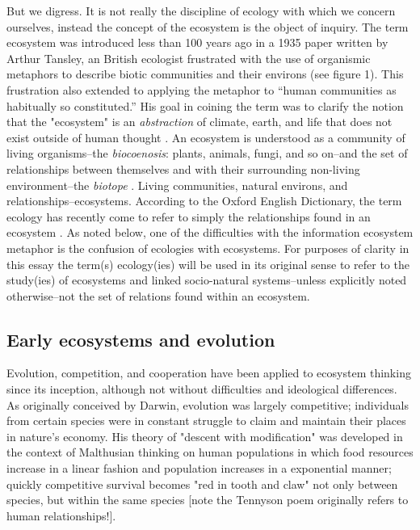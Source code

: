 But we digress. It is not really the discipline of ecology with which we concern ourselves, instead the concept of the ecosystem is the object of inquiry. The term ecosystem was introduced less than 100 years ago in a 1935 paper written by Arthur Tansley, an British ecologist frustrated with the use of organismic metaphors to describe biotic communities and their environs (see figure 1). This frustration also extended to applying the metaphor to “human communities as habitually so constituted.” His goal in coining the term was to clarify the notion that the "ecosystem" is an \textit{abstraction} of climate, earth, and life that does not exist outside of human thought \citep{tansley_1935}. An ecosystem is understood as a community of living organisms--the \textit{biocoenosis}: plants, animals, fungi, and so on--and the set of relationships between themselves and with their surrounding non-living environment--the \textit{biotope} \citep{tansley_1935, odum_1953}. Living communities, natural environs, and relationships--ecosystems. According to the Oxford English Dictionary, the term ecology has recently come to refer to simply the relationships found in an ecosystem \citep{oed_2008}. As noted below, one of the difficulties with the information ecosystem metaphor is the confusion of ecologies with ecosystems. For purposes of clarity in this essay the term(s) ecology(ies) will be used in its original sense to refer to the study(ies) of ecosystems and linked socio-natural systems--unless explicitly noted otherwise--not the set of relations found within an ecosystem. 

\subsection{Early ecosystems and evolution}

Evolution, competition, and cooperation have been applied to ecosystem thinking since its inception, although not without difficulties and ideological differences. As originally conceived by Darwin, evolution was largely competitive; individuals from certain species were in constant struggle to claim and maintain their places in nature's economy. His theory of "descent with modification" was developed in the context of Malthusian thinking on human populations in which food resources increase in a linear fashion and population increases in a exponential manner; quickly competitive survival becomes "red in tooth and claw" not only between species, but within the same species \citep{stoddart_1966,tennyson_1849} [note the Tennyson poem originally refers to human relationships!]. 

